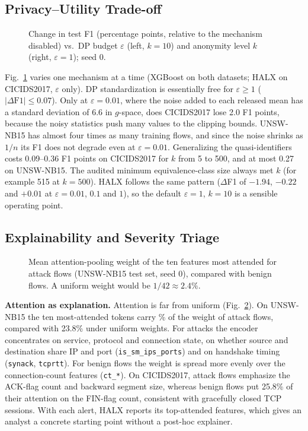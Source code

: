 \subsection{Privacy--Utility Trade-off}
\begin{figure}[t]
\centering

\caption{Change in test F1 (percentage points, relative to the mechanism
disabled) vs.\ DP budget $\varepsilon$ (left, $k=10$) and anonymity level
$k$ (right, $\varepsilon=1$); seed 0.}
\label{fig:privacy}
\end{figure}
Fig.~\ref{fig:privacy} varies one mechanism at a time (XGBoost on both
datasets; HALX on CICIDS2017, $\varepsilon$ only). DP standardization is
essentially free for $\varepsilon\ge1$ ($|\Delta\mathrm{F1}|\le0.07$).
Only at $\varepsilon=0.01$, where the noise added to each released mean
has a standard deviation of 6.6 in $g$-space, does CICIDS2017 lose 2.0 F1
points, because the noisy statistics push many values to the clipping
bounds. UNSW-NB15 has almost four times as many training flows, and since
the noise shrinks as $1/n$ its F1 does not degrade even at
$\varepsilon=0.01$. Generalizing the quasi-identifiers costs 0.09--0.36
F1 points on CICIDS2017 for $k$ from 5 to 500, and at most 0.27 on
UNSW-NB15. The audited minimum equivalence-class size always met $k$ (for
example 515 at $k=500$). HALX follows the same pattern
($\Delta$F1 of $-1.94$, $-0.22$ and $+0.01$ at $\varepsilon=0.01$, $0.1$
and $1$), so the default $\varepsilon=1$, $k=10$ is a sensible operating
point.

\subsection{Explainability and Severity Triage}
\label{sec:explain}
\begin{figure}[t]
\centering
{}
\caption{Mean attention-pooling weight of the ten features most attended
for attack flows (UNSW-NB15 test set, seed 0), compared with benign flows.
A uniform weight would be $1/42\approx2.4\%$.}
\label{fig:attention}
\end{figure}
\textbf{Attention as explanation.} Attention is far from uniform
(Fig.~\ref{fig:attention}). On UNSW-NB15 the ten most-attended tokens carry
\unswtopOneZeroattackmass\% of the weight of attack flows, compared with
23.8\% under uniform weights. For attacks the encoder concentrates on
service, protocol and connection state, on whether source and destination
share IP and port (\texttt{is\_sm\_ips\_ports}) and on handshake timing
(\texttt{synack}, \texttt{tcprtt}). For benign flows the weight is spread
more evenly over the connection-count features (\texttt{ct\_*}). On
CICIDS2017, attack flows emphasize the ACK-flag count and backward segment
size, whereas benign flows put 25.8\% of their attention on the FIN-flag
count, consistent with gracefully closed TCP sessions. With each alert, HALX
reports its top-attended features, which gives an analyst a concrete
starting point without a post-hoc explainer.

